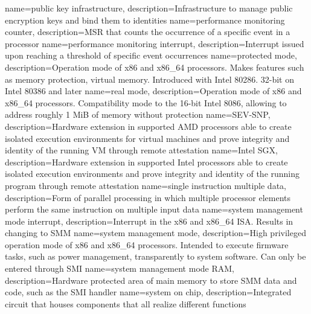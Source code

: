 {
  name=public key infrastructure,
  description={Infrastructure to manage public encryption keys and bind them to identities}
}
{
  name=performance monitoring counter,
  description={MSR that counts the occurrence of a specific event in a processor}
}
{
  name=performance monitoring interrupt,
  description={Interrupt issued upon reaching a threshold of specific event occurrences}
}
{
  name=protected mode,
  description={Operation mode of x86 and x86\_64 processors. Makes features such as memory protection, virtual memory.
  Introduced with Intel 80286. 32-bit on Intel 80386 and later}
}
%
{
  name=real mode,
  description={Operation mode of x86 and x86\_64 processors. Compatibility mode to the 16-bit Intel 8086, allowing to
  address roughly 1 MiB of memory without protection}
}
%
{
  name=SEV-SNP,
  description={Hardware extension in supported AMD processors able to create isolated execution environments for
  virtual machines and prove integrity and identity of the running VM through remote attestation}
}
{
  name=Intel SGX,
  description={Hardware extension in supported Intel processors able to create isolated execution environments and
  prove integrity and identity of the running program through remote attestation}
}
{
  name={single instruction multiple data},
  description={Form of parallel processing in which multiple processor elements perform the same instruction on
  multiple input data}
}
{
  name=system management mode interrupt,
  description={Interrupt in the x86 and x86\_64 ISA. Results in changing to SMM}
}
{
  name=system management mode,
  description={High privileged operation mode of x86 and x86\_64 processors. Intended to execute firmware tasks, such
  as power management, transparently to system software. Can only be entered through SMI}
}
{
  name=system management mode RAM,
  description={Hardware protected area of main memory to store SMM data and code, such as the
  SMI handler}
}
{
  name=system on chip,
  description={Integrated circuit that houses components that all realize different functions}
}
